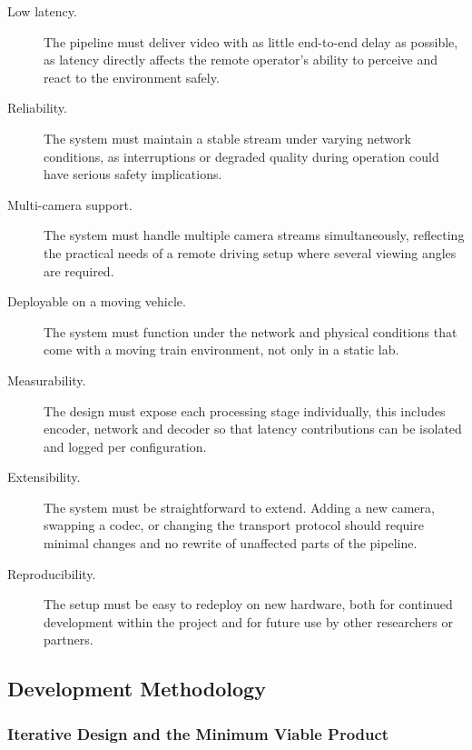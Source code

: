 \begin{description}
  \item[Low latency.] The pipeline must deliver video with as little end-to-end delay as possible, as latency directly affects the remote operator's ability to perceive and react to the environment safely.

  \item[Reliability.] The system must maintain a stable stream under varying network conditions, as interruptions or degraded quality during operation could have serious safety implications.

  \item[Multi-camera support.] The system must handle multiple camera streams simultaneously, reflecting the practical needs of a remote driving setup where several viewing angles are required.

  \item[Deployable on a moving vehicle.] The system must function under the network and physical conditions that come with a moving train environment, not only in a static lab.

  \item[Measurability.] The design must expose each processing stage individually, this includes encoder, network and decoder so that latency contributions can be isolated and logged per configuration.

  \item[Extensibility.] The system must be straightforward to extend. Adding a new camera, swapping a codec, or changing the transport protocol should require minimal changes and no rewrite of unaffected parts of the pipeline.

  \item[Reproducibility.] The setup must be easy to redeploy on new hardware, both for continued development within the project and for future use by other researchers or partners.
\end{description}

\vspace{5mm}
\subsection{Development Methodology}\label{subsec:develop_methodology}

\subsubsection{Iterative Design and the Minimum Viable Product}


